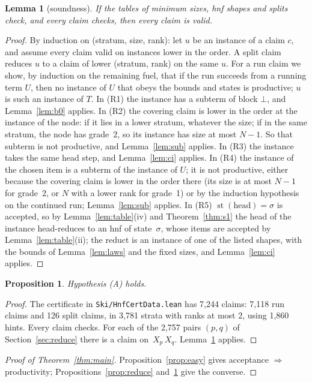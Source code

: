\documentclass[11pt]{amsart}
\newtheorem{lemma}[theorem]{Lemma}
\newtheorem{proposition}[theorem]{Proposition}
\theoremstyle{definition}
\theoremstyle{remark}
\newcommand{\lean}[1]{\texttt{#1}}
\newcommand{\st}{\operatorname{st}}
\begin{document}
\begin{lemma}[soundness]\label{lem:cert}
If the tables of minimum sizes, hnf shapes and splits check, and every claim checks, then every
claim is valid.
\end{lemma}
\begin{proof}
By induction on (stratum, size, rank): let $u$ be an instance of a claim $c$, and assume
every claim valid on instances lower in the order. A split claim reduces $u$ to a claim of
lower (stratum, rank) on the same $u$. For a run claim we show, by induction on the remaining
fuel, that if the run succeeds from a running term $U$, then no instance of $U$ that obeys the
bounds and states is productive; $u$ is such an instance of $T$. In (R1) the instance has a
subterm of block $\bot$, and Lemma~\ref{lem:b0} applies. In (R2) the covering claim is lower
in the order at the instance of the node: if it lies in a lower stratum, whatever the size;
if in the same stratum, the node has grade~$2$, so its instance has size at most $N-1$. So
that subterm is not productive, and Lemma~\ref{lem:sub} applies. In (R3) the instance takes the same head step,
and Lemma~\ref{lem:ci} applies. In (R4) the instance of the chosen item is a subterm of the
instance of $U$; it is not productive, either because the covering claim is lower in the order
there (its size is at most $N-1$ for grade~2, or $N$ with a lower rank for grade~1) or by the
induction hypothesis on the continued run; Lemma~\ref{lem:sub} applies. In (R5)
$\st(\text{head})=\sigma$ is accepted, so by Lemma~\ref{lem:table}(iv) and
Theorem~\ref{thm:s1} the head of the instance head-reduces to an hnf of state~$\sigma$, whose
items are accepted by Lemma~\ref{lem:table}(ii); the reduct is an instance of one of the
listed shapes, with the bounds of Lemma~\ref{lem:laws} and the fixed sizes, and
Lemma~\ref{lem:ci} applies.
\end{proof}

\begin{proposition}\label{prop:A}
Hypothesis \textup{(A)} holds.
\end{proposition}
\begin{proof}
The certificate in \lean{Ski/HnfCertData.lean} has 7,244 claims: 7,118 run claims and 126
split claims, in 3,781 strata with ranks at most 2, using 1,860 hints. Every claim checks.
For each of the 2,757 pairs $(p,q)$ of Section~\ref{sec:reduce} there is a claim
on~$X_p\,X_q$. Lemma~\ref{lem:cert} applies.
\end{proof}

\begin{proof}[Proof of Theorem~\ref{thm:main}]
Proposition~\ref{prop:easy} gives acceptance $\Rightarrow$ productivity; Propositions~\ref{prop:reduce} and~\ref{prop:A} give the converse.
\end{proof}
\end{document}
